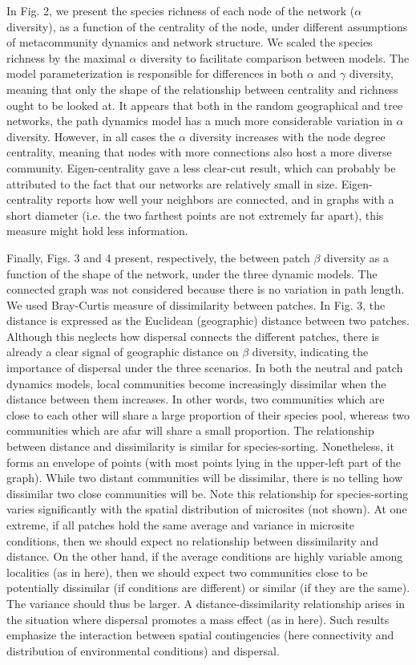 \documentclass[12pt]{article}
\begin{document}
In Fig. 2, we present the species richness of each node of the network ($\alpha$
diversity), as a function of the centrality of the node, under different
assumptions of metacommunity dynamics and network structure. We scaled the
species richness by the maximal $\alpha$ diversity to facilitate comparison
between models. The model parameterization is responsible for differences in
both $\alpha$ and $\gamma$ diversity, meaning that only the shape of the
relationship between centrality and richness ought to be looked at. It appears
that both in the random geographical and tree networks, the path dynamics model has a
much more considerable variation in $\alpha$ diversity. However, in all
cases the $\alpha$ diversity increases with the node degree centrality, meaning
that nodes with more connections also host a more diverse community.
Eigen-centrality gave a less clear-cut result, which can probably be
attributed to the fact that our networks are relatively small in size.
Eigen-centrality reports how well your neighbors are connected, and in graphs
with a short diameter (i.e. the two farthest points are not extremely far
apart), this measure might hold less information.

Finally, Figs. 3 and 4 present, respectively, the between patch $\beta$
diversity as a function of the shape of the network, under the three dynamic
models. The connected graph was not considered because there is no variation in
path length. We used Bray-Curtis measure of dissimilarity between patches. In
Fig. 3, the distance is expressed as the Euclidean (geographic) distance between
two patches. Although this neglects how dispersal connects the different
patches, there is already a clear signal of geographic distance on $\beta$
diversity, indicating the importance of dispersal under the three scenarios. In
both the neutral and patch dynamics models, local communities become increasingly
dissimilar when the distance between them increases. In other words, two
communities which are close to each other will share a large proportion of their
species pool, whereas two communities which are afar will share a small
proportion. The relationship between distance and dissimilarity is similar for
species-sorting. Nonetheless, it forms an envelope of points (with most points
lying in the upper-left part of the graph). While two distant communities will
be dissimilar, there is no telling how dissimilar two close communities will be.
Note this relationship for species-sorting varies significantly with the spatial
distribution of microsites (not shown). At one extreme, if all patches hold the
same average and variance in microsite conditions, then we should expect no relationship between
dissimilarity and distance. On the other hand, if the average conditions are
highly variable among localities (as in here), then we should expect two
communities close to be potentially dissimilar (if conditions are different) or
similar (if they are the same). The variance should thus be larger. A
distance-dissimilarity relationship arises in the situation where dispersal
promotes a mass effect (as in here). Such results emphasize the interaction
between spatial contingencies (here connectivity and distribution of
environmental conditions) and dispersal.
\end{document}
